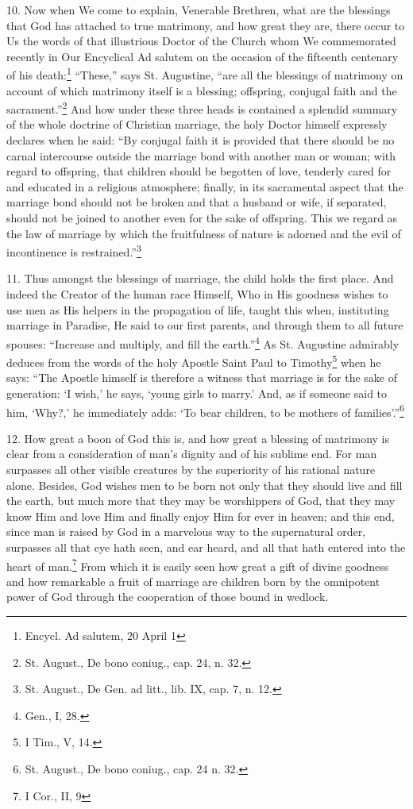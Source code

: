 \documentclass[12pt,a4paper]{book}
\begin{document}
10. Now when We come to explain, Venerable Brethren, what are the blessings that God has attached to true matrimony, and how great they are, there occur to Us the words of that illustrious Doctor of the Church whom We commemorated recently in Our Encyclical Ad salutem on the occasion of the fifteenth centenary of his death:\footnote{Encycl. Ad salutem, 20 April 1} ``These,'' says St. Augustine, ``are all the blessings of matrimony on account of which matrimony itself is a blessing; offspring, conjugal faith and the sacrament.''\footnote{St. August., De bono coniug., cap. 24, n. 32.} And how under these three heads is contained a splendid summary of the whole doctrine of Christian marriage, the holy Doctor himself expressly declares when he said: ``By conjugal faith it is provided that there should be no carnal intercourse outside the marriage bond with another man or woman; with regard to offspring, that children should be begotten of love, tenderly cared for and educated in a religious atmosphere; finally, in its sacramental aspect that the marriage bond should not be broken and that a husband or wife, if separated, should not be joined to another even for the sake of offspring. This we regard as the law of marriage by which the fruitfulness of nature is adorned and the evil of incontinence is restrained.''\footnote{St. August., De Gen. ad litt., lib. IX, cap. 7, n. 12.}

11. Thus amongst the blessings of marriage, the child holds the first place. And indeed the Creator of the human race Himself, Who in His goodness wishes to use men as His helpers in the propagation of life, taught this when, instituting marriage in Paradise, He said to our first parents, and through them to all future spouses: ``Increase and multiply, and fill the earth.''\footnote{Gen., I, 28.} As St. Augustine admirably deduces from the words of the holy Apostle Saint Paul to Timothy\footnote{I Tim., V, 14.} when he says: ``The Apostle himself is therefore a witness that marriage is for the sake of generation: `I wish,' he says, `young girls to marry.' And, as if someone said to him, `Why?,' he immediately adds: `To bear children, to be mothers of families'.''\footnote{St. August., De bono coniug., cap. 24 n. 32.}

12. How great a boon of God this is, and how great a blessing of matrimony is clear from a consideration of man's dignity and of his sublime end. For man surpasses all other visible creatures by the superiority of his rational nature alone. Besides, God wishes men to be born not only that they should live and fill the earth, but much more that they may be worshippers of God, that they may know Him and love Him and finally enjoy Him for ever in heaven; and this end, since man is raised by God in a marvelous way to the supernatural order, surpasses all that eye hath seen, and ear heard, and all that hath entered into the heart of man.\footnote{I Cor., II, 9} From which it is easily seen how great a gift of divine goodness and how remarkable a fruit of marriage are children born by the omnipotent power of God through the cooperation of those bound in wedlock.
\end{document}
